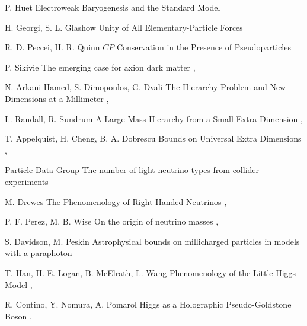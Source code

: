 {P. Huet}
{Electroweak Baryogenesis and the Standard Model}
{}

{H. Georgi, S. L. Glashow}
{Unity of All Elementary-Particle Forces}
{}

{R. D. Peccei, H. R. Quinn}
{$CP$ Conservation in the Presence of Pseudoparticles}
{}

{P. Sikivie}
{The emerging case for axion dark matter}
{, }

{N. Arkani-Hamed, S. Dimopoulos, G. Dvali}
{The Hierarchy Problem and New Dimensions at a Millimeter}
{, }

{L. Randall, R. Sundrum}
{A Large Mass Hierarchy from a Small Extra Dimension}
{, }

{T. Appelquist, H. Cheng, B. A. Dobrescu}
{Bounds on Universal Extra Dimensions}
{, }

{Particle Data Group}
{The number of light neutrino types from collider experiments}
{}

{M. Drewes}
{The Phenomenology of Right Handed Neutrinos}
{, }

{P. F. Perez, M. B. Wise}
{On the origin of neutrino masses}
{, }

{S. Davidson, M. Peskin}
{Astrophysical bounds on millicharged particles in models with a paraphoton}
{}

{T. Han, H. E. Logan, B. McElrath, L. Wang}
{Phenomenology of the Little Higgs Model}
{, }

{R. Contino, Y. Nomura, A. Pomarol}
{Higgs as a Holographic Pseudo-Goldstone Boson}
{, }

